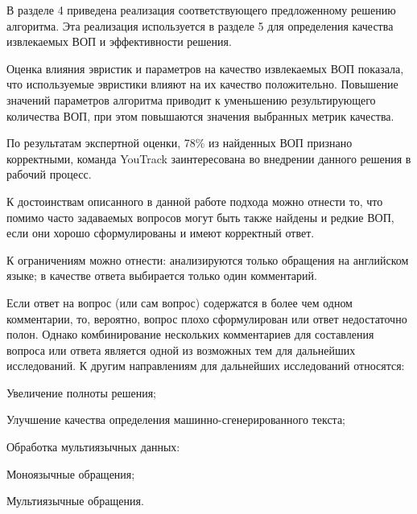 В разделе 4 приведена реализация соответствующего предложенному решению алгоритма. Эта реализация используется в разделе 5 для определения качества извлекаемых ВОП и эффективности решения.

Оценка влияния эвристик и параметров на качество извлекаемых ВОП показала, что используемые эвристики влияют на их качество положительно. Повышение значений параметров алгоритма приводит к уменьшению результирующего количества ВОП, при этом повышаются значения выбранных метрик качества.

По результатам экспертной оценки, 78\% из найденных ВОП признано корректными, команда YouTrack заинтересована во внедрении данного решения в рабочий процесс.

К достоинствам описанного в данной работе подхода можно отнести то, что помимо часто задаваемых вопросов могут быть также найдены и редкие ВОП, если они хорошо сформулированы и имеют корректный ответ.

К ограничениям можно отнести: анализируются только обращения на английском языке; в качестве ответа выбирается только один комментарий. 

Если ответ на вопрос (или сам вопрос) содержатся в более чем одном комментарии, то, вероятно, вопрос плохо сформулирован или ответ недостаточно полон. Однако комбинирование нескольких комментариев для составления вопроса или ответа является одной из возможных тем для дальнейших исследований. К другим направлениям для дальнейших исследований относятся:

\begin{itemize*}
\item Увеличение полноты решения;
\item Улучшение качества определения машинно-сгенерированного текста;
\item Обработка мультиязычных данных: 
\begin{itemize*}
\item Моноязычные обращения; 
\item Мультиязычные обращения.
\end{itemize*}
\end{itemize*}
